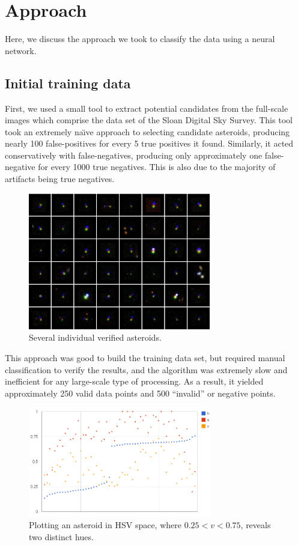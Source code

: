 \documentclass[conference]{IEEEtran}
\begin{document}
\section{Approach}
Here, we discuss the approach we took to classify the data using a neural
network.

\subsection{Initial training data}
First, we used a small tool to extract potential candidates from the full-scale
images which comprise the data set of the Sloan Digital Sky Survey. This tool
took an extremely na\"{\i}ve approach to selecting candidate asteroids,
producing nearly 100 false-positives for every 5 true positives it found.
Similarly, it acted conservatively with false-negatives, producing only
approximately one false-negative for every 1000 true negatives. This is also due
to the majority of artifacts being true negatives.

\begin{figure}
\centering
\includegraphics[width=80mm]{refs/valid.png}
\caption{Several individual verified asteroids.}
\end{figure}

This approach was good to build the training data set, but required manual
classification to verify the results, and the algorithm was extremely slow and
inefficient for any large-scale type of processing. As a result, it yielded
approximately 250 valid data points and 500 ``invalid'' or negative points.

\begin{figure}
\centering
\includegraphics[width=80mm]{refs/chart_1.png}
\caption{Plotting an asteroid in HSV space, where $0.25 < v < 0.75$, reveals two
distinct hues.}
\end{figure}
\end{document}

